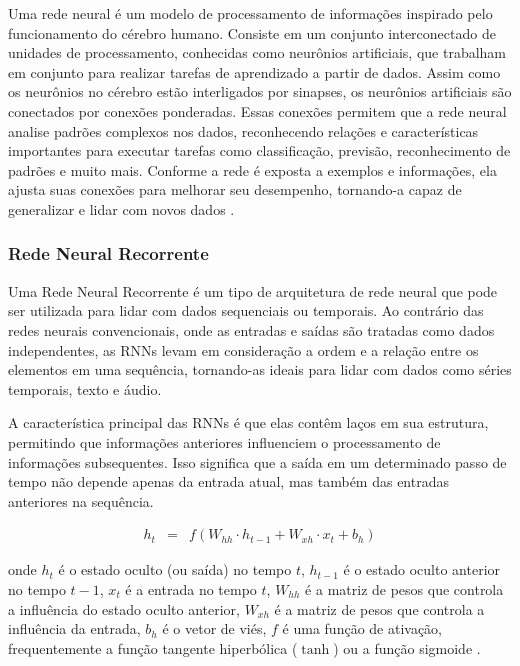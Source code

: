 Uma rede neural é um modelo de processamento de informações inspirado pelo funcionamento do cérebro humano. Consiste em um conjunto interconectado de unidades de processamento, conhecidas como neurônios artificiais, que trabalham em conjunto para realizar tarefas de aprendizado a partir de dados. Assim como os neurônios no cérebro estão interligados por sinapses, os neurônios artificiais são conectados por conexões ponderadas. Essas conexões permitem que a rede neural analise padrões complexos nos dados, reconhecendo relações e características importantes para executar tarefas como classificação, previsão, reconhecimento de padrões e muito mais. Conforme a rede é exposta a exemplos e informações, ela ajusta suas conexões para melhorar seu desempenho, tornando-a capaz de generalizar e lidar com novos dados \cite{silva2003redes}.

\subsubsection{Rede Neural Recorrente}


Uma Rede Neural Recorrente é um tipo de arquitetura de rede neural que pode ser utilizada para lidar com dados sequenciais ou temporais. Ao contrário das redes neurais convencionais, onde as entradas e saídas são tratadas como dados independentes, as RNNs levam em consideração a ordem e a relação entre os elementos em uma sequência, tornando-as ideais para lidar com dados como séries temporais, texto e áudio.

A característica principal das RNNs é que elas contêm laços em sua estrutura, permitindo que informações anteriores influenciem o processamento de informações subsequentes. Isso significa que a saída em um determinado passo de tempo não depende apenas da entrada atual, mas também das entradas anteriores na sequência.


\begin{eqnarray}
	h_t &=& f(W_{hh} \cdot h_{t-1} + W_{xh} \cdot x_t + b_h)
\end{eqnarray}

\noindent onde \( h_t \) é o estado oculto (ou saída) no tempo \( t \), \( h_{t-1} \) é o estado oculto anterior no tempo \( t-1 \), \( x_t \) é a entrada no tempo \( t \), \( W_{hh} \) é a matriz de pesos que controla a influência do estado oculto anterior, \( W_{xh} \) é a matriz de pesos que controla a influência da entrada, \( b_h \) é o vetor de viés, \( f \) é uma função de ativação, frequentemente a função tangente hiperbólica ($\operatorname{tanh}$) ou a função sigmoide \cite{lstm}.


